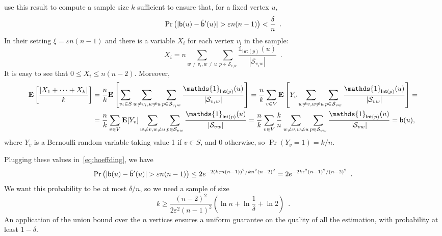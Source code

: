 \citet{BrandesP07} use this result to compute a sample size $k$ sufficient to ensure that, for
a fixed vertex $u$,
\[ 
\Pr\left(|\betw(u)-\tilde\betw'(u)|>\varepsilon n(n-1)\right)<\frac{\delta}{n}\enspace.
\]
In their setting $\xi=\varepsilon n(n-1)$ and there is a variable $X_i$ for
each vertex $v_i$ in the sample:
\[ 
X_i=n\sum_{w\neq v_i,w\neq
u}\sum_{p\in\mathcal{S}_{v_iw}}\frac{\mathds{1}_{\mathsf{Int}(p)}(u)}{|\mathcal{S}_{v_iw}|}\enspace
.
\]
It is easy to see that $0\le X_i\le n(n-2)$. Moreover,
\begin{align*}
\mathbf{E}\left[\frac{|X_1+\dotsb+X_k|}{k}\right] &=
\frac{n}{k}\mathbf{E}\left[\sum_{v_i\in S}\sum_{w\neq v_i,w\neq
u}\sum_{p\in\mathcal{S}_{v_iw}}\frac{\mathds{1}_{\mathsf{Int}(p)}(u)}{|\mathcal{S}_{v_iw}|}\right]
=\frac{n}{k}\sum_{v\in V}\mathbf{E}\left[Y_v\sum_{w\neq v,w\neq
u}\sum_{p\in\mathcal{S}_{vw}}\frac{\mathds{1}_{\mathsf{Int}(p)}(u)}{|\mathcal{S}_{vw}|}\right] =
\\
&=\frac{n}{k}\sum_{v\in V}\mathbf{E}[Y_v]\sum_{w\neq v,w\neq
u}\sum_{p\in\mathcal{S}_{vw}}\frac{\mathds{1}_{\mathsf{Int}(p)}(u)}{|\mathcal{S}_{vw}|}
=\frac{n}{k}\sum_{v\in V}\frac{k}{n}\sum_{w\neq v,w\neq
u}\sum_{p\in\mathcal{S}_{vw}}\frac{\mathds{1}_{\mathsf{Int}(p)}(u)}{|\mathcal{S}_{vw}|}
= \betw(u),
\end{align*}
where $Y_v$ is a Bernoulli random variable taking value 1 if $v\in S$, and 0
otherwise, so $\Pr(Y_v=1)=k/n$.

Plugging these values in~\eqref{eq:hoeffding}, we have
\[
\Pr\left(|\betw(u)-\tilde\betw'(u)|>\varepsilon n(n-1)\right)\leq
2e^{-2(k\varepsilon n(n-1))^2/kn^2(n-2)^2}=2e^{-2k\epsilon^2(n-1)^2/(n-2)^2}\enspace.
\]
We want this probability to be at most $\delta/n$, so we need a sample of size
\[
k\geq \frac{(n-2)^2}{2\varepsilon^2(n-1)^2}\left(\ln n
+\ln\frac{1}{\delta} +\ln 2\right)\enspace.
\]
An application of the union bound over the $n$ vertices ensures a uniform guarantee on the quality of
all the estimation, with probability at least $1-\delta$.

